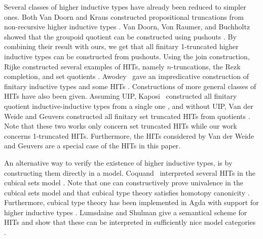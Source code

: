 Several classes of higher inductive types have already been reduced to simpler ones.
Both Van Doorn and Kraus constructed propositional truncations from non-recursive higher inductive types
\cite{Doorn16,Kraus16}.
Van Doorn, Von Raumer, and Buchholtz showed that the groupoid quotient can be constructed using pushouts \cite{DoornRB17}.
By combining their result with ours, we get that all finitary 1-truncated higher inductive types can be constructed from pushouts.
Using the join construction, Rijke constructed several examples of HITs, namely $n$-truncations, the Rezk completion,
and set quotients \cite{rijke2017join}.
Awodey \etal \ gave an impredicative construction of finitary inductive types and some HITs \cite{awodey2018impredicative}. 
Constructions of more general classes of HITs have also been given.
Assuming UIP, Kaposi \etal \ constructed all finitary quotient inductive-inductive types
from a single one \cite{KaposiKA19}, and without UIP, Van der Weide and Geuvers
constructed all finitary set truncated HITs from quotients \cite{van2019construction}.
Note that these two works only concern set truncated HITs while our work concerns 1-truncated HITs.
Furthermore, the HITs considered by Van der Weide and Geuvers are a special case of
the HITs in this paper.

An alternative way to verify the existence of higher inductive types,
is by constructing them directly in a model.
Coquand \etal \ interpreted several HITs in the cubical sets model \cite{BezemCH13,CoquandHM18}.
Note that one can constructively prove univalence in the cubical sets model \cite{CohenCHM16}
and that cubical type theory satisfies homotopy canonicity \cite{DBLP:conf/rta/CoquandHS19}.
Furthermore, cubical type theory has been implemented in Agda with support for higher inductive types \cite{vezzosi2019cubical}.
Lumsdaine and Shulman give a semantical scheme for HITs and show that these can be interpreted
in sufficiently nice model categories \cite{lumsdaine2017semantics}.

